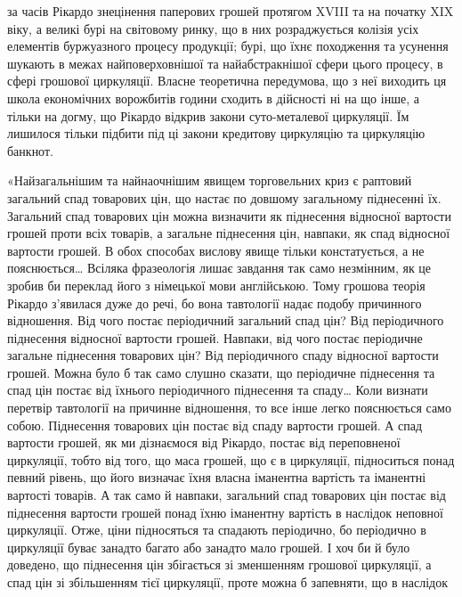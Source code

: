 \parcont{}  %
за часів Рікардо знецінення паперових грошей протягом XVIII та на початку
XIX віку, а великі бурі на світовому ринку, що в них розраджується колізія
усіх елементів буржуазного процесу продукції; бурі, що їхнє походження та усунення
шукають в межах найповерховнішої та найабстракнішої сфери цього процесу,
в сфері грошової циркуляції. Власне теоретична передумова, що з неї виходить
ця школа економічних ворожбитів години сходить в дійсності ні на що інше, а
тільки на догму, що Рікардо відкрив закони суто-металевої циркуляції. Їм лишилося
тільки підбити під ці закони кредитову циркуляцію та циркуляцію банкнот.

«Найзагальнішим та найнаочнішим явищем торговельних криз є раптовий
загальний спад товарових цін, що настає по довшому загальному піднесенні їх.
Загальний спад товарових цін можна визначити як піднесення відносної вартости
грошей проти всіх товарів, а загальне піднесення цін, навпаки, як спад
відносної вартости грошей. В обох способах вислову явище тільки констатується,
а не пояснюється\dots{} Всіляка фразеологія лишає завдання так само
незмінним, як це зробив би переклад його з німецької мови англійською. Тому
грошова теорія Рікардо з’явилася дуже до речі, бо вона тавтології надає подобу
причинного відношення. Від чого постає періодичний загальний спад цін? Від
періодичного піднесення відносної вартости грошей. Навпаки, від чого постає
періодичне загальне піднесення товарових цін? Від періодичного спаду відносної
вартости грошей. Можна було б так само слушно сказати, що періодичне піднесення
та спад цін постає від їхнього періодичного піднесення та спаду\dots{}
Коли визнати перетвір тавтології на причинне відношення, то все інше легко
пояснюється само собою. Піднесення товарових цін постає від спаду вартости
грошей. А спад вартости грошей, як ми дізнаємося від Рікардо, постає від переповненої
циркуляції, тобто від того, що маса грошей, що є в циркуляції, підноситься
понад певний рівень, що його визначає їхня власна іманентна вартість
та іманентні вартості товарів. А так само й навпаки, загальний спад товарових цін
постає від піднесення вартости грошей понад їхню іманентну вартість в наслідок
неповної циркуляції. Отже, ціни підносяться та спадають періодично, бо періодично
в циркуляції буває занадто багато або занадто мало грошей. І хоч би й було
доведено, що піднесення цін збігається зі зменшенням грошової циркуляції, а
спад цін зі збільшенням тієї циркуляції, проте можна б запевняти, що в наслідок
